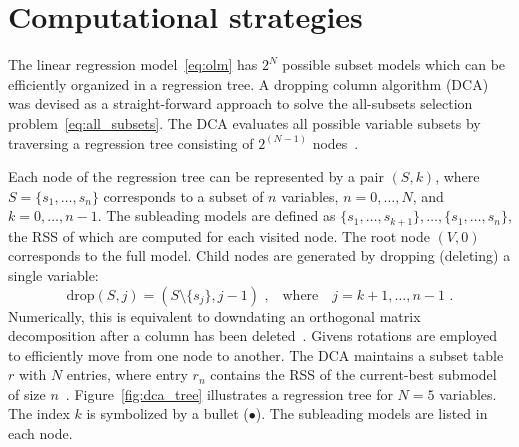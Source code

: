 \documentclass[article]{jss}
\newcommand{\drop}{\mathrm{drop}}
\begin{document}
\vspace*{-0.3cm}

\section{Computational strategies}
\label{sec:comput}

The linear regression model~\eqref{eq:olm} has $2^N$ possible subset
models which can be efficiently organized in a regression tree.  A
dropping column algorithm (DCA) was devised as a straight-forward
approach to solve the all-subsets selection
problem~\eqref{eq:all_subsets}.  The DCA evaluates all possible
variable subsets by traversing a regression tree consisting of
$2^{(N-1)}$
nodes~\citep{gatu:parallel_comput:03,gatu:comput_stat_data_an:07,smith:comput_stat_data_an:89}.

Each node of the regression tree can be represented by a pair $(S,k)$,
where $S=\{s_1,\ldots,s_n\}$ corresponds to a subset of $n$ variables,
$n=0,\ldots,N$, and $k=0,\ldots,n-1$.  The subleading models are
defined as $\{s_1,\ldots,s_{k+1}\}, \ldots, \{s_1,\ldots,s_n\}$, the
RSS of which are computed for each visited node.  The root node
$(V,0)$ corresponds to the full model.  Child nodes are generated by
dropping (deleting) a single variable:
%
\begin{equation*}
  \drop(S,j)=(S\setminus\{s_j\},j-1)\text{ ,}
  \quad\text{where}\quad
  j=k+1,\ldots,n-1\text{ .}
\end{equation*}
%
Numerically, this is equivalent to downdating an orthogonal matrix
decomposition after a column has been
deleted~\citep{golub:96,kontoghiorghes:00,smith:comput_stat_data_an:89}.
Givens rotations are employed to efficiently move from one node to
another.  The DCA maintains a subset table $r$ with $N$ entries, where
entry $r_n$ contains the RSS of the current-best submodel of size
$n$~\citep{gatu:j_comput_graph_stat:06,hofmann:comput_stat_data_an:07}.
Figure~\ref{fig:dca_tree} illustrates a regression tree for $N=5$
variables.  The index $k$ is symbolized by a bullet ($\bullet$).  The
subleading models are listed in each node.
\end{document}
